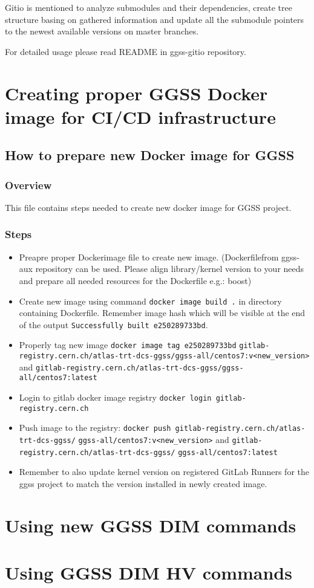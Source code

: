 Gitio is mentioned to analyze submodules and their dependencies, create tree structure basing on gathered information and update all the submodule pointers to the newest available versions on master branches.

For detailed usage please read README in ggss-gitio repository.

\clearpage
\section{Creating proper GGSS Docker image for CI/CD infrastructure}

\subsection*{How to prepare new Docker image for GGSS}

\subsubsection*{Overview}
This file contains steps needed to create new docker image for GGSS project.

\subsubsection*{Steps}
\begin{itemize}
    \item Preapre proper Dockerimage file to create new image. (Dockerfilefrom ggss-aux repository can be used. Please align library/kernel version to your needs and prepare all needed resources for the Dockerfile e.g.: boost)
    \item Create new image using command \lstinline{docker image build .} in directory containing Dockerfile. Remember image hash which will be visible at the end of the output \lstinline{Successfully built e250289733bd}.
    \item Properly tag new image \lstinline{docker image tag e250289733bd} \lstinline{gitlab-registry.cern.ch/atlas-trt-dcs-ggss/ggss-all/centos7:v<new_version>} and \lstinline{gitlab-registry.cern.ch/atlas-trt-dcs-ggss/ggss-all/centos7:latest}
    \item Login to gitlab docker image registry \lstinline{docker login gitlab-registry.cern.ch}
    \item Push image to the registry: \lstinline{docker push gitlab-registry.cern.ch/atlas-trt-dcs-ggss/} \lstinline{ggss-all/centos7:v<new_version>} and \lstinline{gitlab-registry.cern.ch/atlas-trt-dcs-ggss/} \lstinline{ggss-all/centos7:latest}
    \item Remember to also update kernel version on registered GitLab Runners for the ggss project to match the version installed in newly created image.
\end{itemize}

\section{Using new GGSS DIM commands}
\section{Using GGSS DIM HV commands}